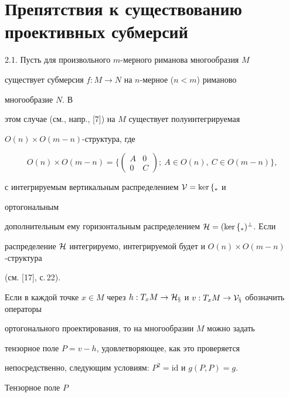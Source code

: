  


\section{Препятствия к существованию проективных субмерсий} 


 


2.1. Пусть для произвольного $m$-мерного риманова многообразия $M$ 


существует субмерсия $f:M\to N$ на $n$-мерное ($n<m$) риманово 


многообразие $N$. В 


этом случае (см., напр., [7]) на $M$ существует полуинтегрируемая 


$O(n)\times O(m-n)$-структура, где


$$ 


O(n)\times O(m-n)=\bigg\{ 


\begin{pmatrix} 


A & 0 \\ 0 & C 


\end{pmatrix} 


;\ A\in O(n),\ C\in O(m-n)\bigg\},


$$ 


с интегрируемым вертикальным распределением $\cal V=\ker f_*$ и 


ортогональным 


дополнительным ему горизонтальным распределением $\cal H=(\ker 


f_*)^\bot$. Если 


распределение $\cal H$ интегрируемо, интегрируемой будет и $O(n)\times 


O(m-n)$-структура 


(см. [17], с.\,22). 


 


Если в каждой точке $x\in M$ через $h:T_x M\to\cal H_x$ и $v:T_x M\to 


\cal V_x$ обозначить операторы 


ортогонального проектирования, то на многообразии $M$ можно задать 


тензорное поле $P=v-h$, удовлетворяющее, как это проверяется 


непосредственно, следующим условиям: $P^2=\text{id}$ и $g(P,P)=g$. 


Тензорное поле $P$ 


